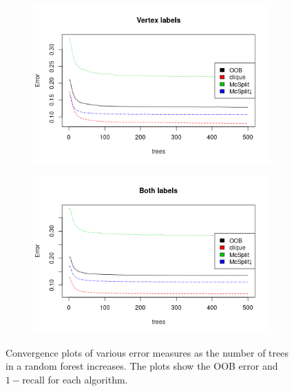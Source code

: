 \documentclass{l4proj}
\theoremstyle{definition}
\theoremstyle{remark}
\begin{document}
\begin{figure}
  \centering
  \begin{subfigure}[t]{0.49\textwidth}
    \centering
    \includegraphics[width=\textwidth]{images/vertex_labels_forest_errors.png}
  \end{subfigure}
  \begin{subfigure}[t]{0.49\textwidth}
    \centering
    \includegraphics[width=\textwidth]{images/both_labels_forest_errors.png}
  \end{subfigure}
  \caption{Convergence plots of various error measures as the number of trees in
    a random forest increases. The plots show the OOB error and $1 -
    \text{recall}$ for each algorithm.}
  \label{fig:forest_errors}
\end{figure}
\end{document}

